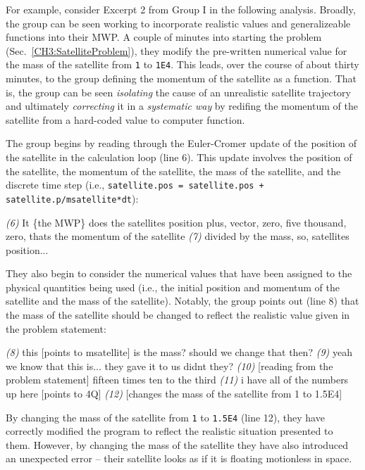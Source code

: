 \documentclass{msuphddissertation}
\begin{document}
\begin{doublespace}
For example, consider Excerpt 2 from Group I in the following analysis.  Broadly, the group can be seen working to incorporate realistic values and generalizeable functions into their MWP.  A couple of minutes into starting the problem (Sec.~\ref{CH3:SatelliteProblem}), they modify the pre-written numerical value for the mass of the satellite from \texttt{1} to \texttt{1E4}.  This leads, over the course of about thirty minutes, to the group defining the momentum of the satellite as a function.  That is, the group can be seen \textit{isolating} the cause of an unrealistic satellite trajectory and ultimately \textit{correcting} it in a \textit{systematic way} by redifing the momentum of the satellite from a hard-coded value to computer function.

The group begins by reading through the Euler-Cromer update of the position of the satellite in the calculation loop (line 6).  This update involves the position of the satellite, the momentum of the satellite, the mass of the satellite, and the discrete time step (i.e., \texttt{satellite.pos = satellite.pos + satellite.p/msatellite*dt}):  \begin{description}
\SC \textit{(6)} It \{the MWP\} does the satellites position plus, vector, zero, five thousand, zero, thats the momentum of the satellite
\SC \textit{(7)} divided by the mass, so, satellites position...\end{description}  They also begin to consider the numerical values that have been assigned to the physical quantities being used (i.e., the initial position and momentum of the satellite and the mass of the satellite).  Notably, the group points out (line 8) that the mass of the satellite should be changed to reflect the realistic value given in the problem statement: \begin{description}
\SD \textit{(8)} this [points to msatellite] is the mass? should we change that then?
\SC \textit{(9)} yeah we know that this is... they gave it to us didnt they?
\SD \textit{(10)} [reading from the problem statement] fifteen times ten to the third
\SA \textit{(11)} i have all of the numbers up here [points to 4Q]
\SC \textit{(12)} [changes the mass of the satellite from 1 to 1.5E4]
\end{description}  By changing the mass of the satellite from \texttt{1} to \texttt{1.5E4} (line 12), they have correctly modified the program to reflect the realistic situation presented to them.  However, by changing the mass of the satellite they have also introduced an unexpected error -- their satellite looks as if it is floating motionless in space.


\end{doublespace}
\end{document}
